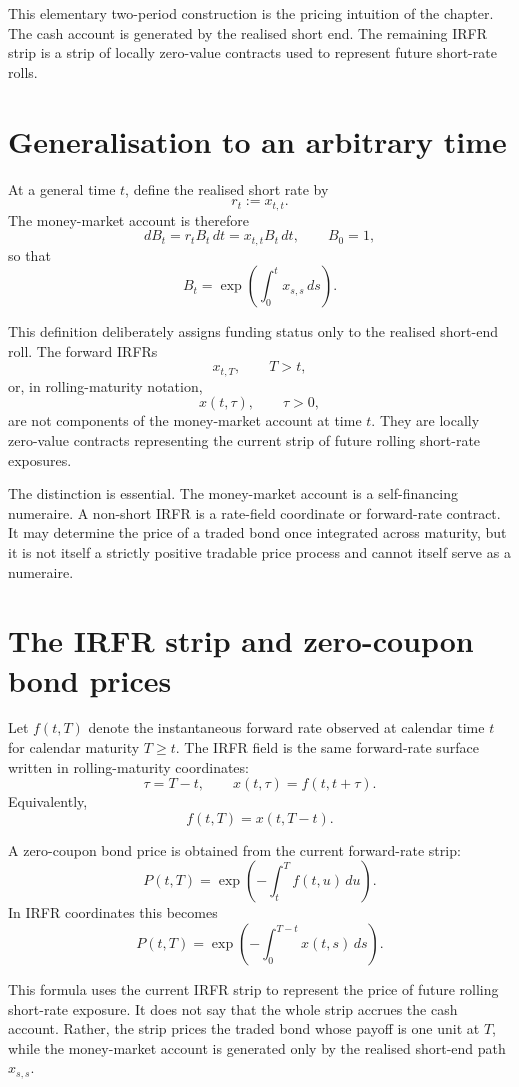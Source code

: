 \documentclass[11pt,oneside]{book}
\begin{document}
This elementary two-period construction is the pricing intuition of the
chapter. The cash account is generated by the realised short end. The
remaining IRFR strip is a strip of locally zero-value contracts used to
represent future short-rate rolls.

\section{Generalisation to an arbitrary time}
\label{generalisation-to-an-arbitrary-time}

At a general time \(t\), define the realised short rate by
\[
r_t:=x_{t,t}.
\]
The money-market account is therefore
\[
dB_t=r_tB_t\,dt=x_{t,t}B_t\,dt,
\qquad B_0=1,
\]
so that
\[
B_t=\exp\left(\int_0^t x_{s,s}\,ds\right).
\]

This definition deliberately assigns funding status only to the realised
short-end roll. The forward IRFRs
\[
x_{t,T},\qquad T>t,
\]
or, in rolling-maturity notation,
\[
x(t,\tau),\qquad \tau>0,
\]
are not components of the money-market account at time \(t\). They are
locally zero-value contracts representing the current strip of future
rolling short-rate exposures.

The distinction is essential. The money-market account is a self-financing
numeraire. A non-short IRFR is a rate-field coordinate or forward-rate
contract. It may determine the price of a traded bond once integrated
across maturity, but it is not itself a strictly positive tradable price
process and cannot itself serve as a numeraire.

\section{The IRFR strip and zero-coupon bond prices}
\label{irfr-strip-and-zero-coupon-bond-prices}

Let \(f(t,T)\) denote the instantaneous forward rate observed at calendar
time \(t\) for calendar maturity \(T\geq t\). The IRFR field is the same
forward-rate surface written in rolling-maturity coordinates:
\[
\tau=T-t,
\qquad
x(t,\tau)=f(t,t+\tau).
\]
Equivalently,
\[
f(t,T)=x(t,T-t).
\]

A zero-coupon bond price is obtained from the current forward-rate strip:
\[
P(t,T)
=
\exp\left(-\int_t^T f(t,u)\,du\right).
\]
In IRFR coordinates this becomes
\[
P(t,T)
=
\exp\left(-\int_0^{T-t}x(t,s)\,ds\right).
\]

This formula uses the current IRFR strip to represent the price of future
rolling short-rate exposure. It does not say that the whole strip accrues
the cash account. Rather, the strip prices the traded bond whose payoff is
one unit at \(T\), while the money-market account is generated only by the
realised short-end path \(x_{s,s}\).
\end{document}
